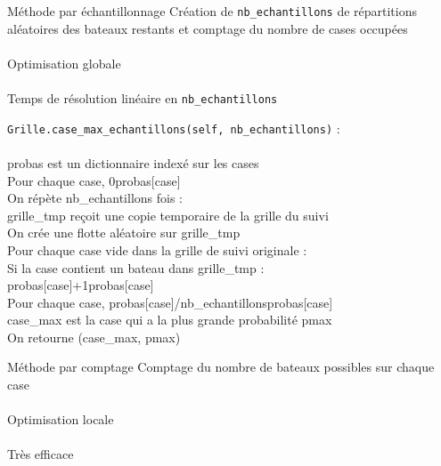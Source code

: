 \begin{frame}{Méthode par échantillonnage}
Création de \texttt{nb\_echantillons} de répartitions aléatoires des bateaux restants et comptage du nombre de cases occupées\\~\\ \pause
Optimisation globale\\~\\ \pause
Temps de résolution linéaire en \texttt{nb\_echantillons}
\end{frame}

{
\begin{frame}[allowframebreaks]
\texttt{Grille.case\_max\_echantillons(self, nb\_echantillons)} :\\~\\
probas est un dictionnaire indexé sur les cases\\
Pour chaque case, 0\sto probas[case]\\
On répète nb\_echantillons fois :\\
grille\_tmp reçoit une copie temporaire de la grille du suivi\\
On crée une flotte aléatoire sur grille\_tmp\\
Pour chaque case vide dans la grille de suivi originale :\\
Si la case contient un bateau dans grille\_tmp :\\
probas[case]+1\sto probas[case]\\
Pour chaque case, probas[case]/nb\_echantillons\sto probas[case]\\
case\_max est la case qui a la plus grande probabilité pmax\\
On retourne (case\_max, pmax)\\
\end{frame}
}

\begin{frame}{Méthode par comptage}
Comptage du nombre de bateaux possibles sur chaque case\\~\\ \pause
Optimisation locale\\~\\ \pause
Très efficace 
\end{frame}

